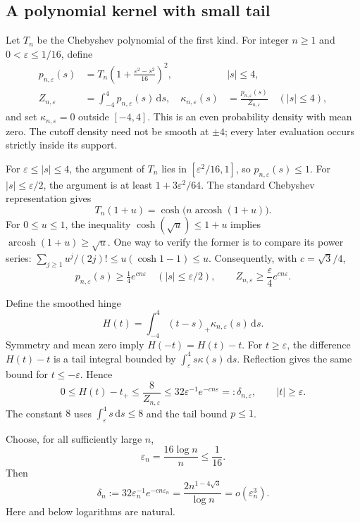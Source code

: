 \documentclass[11pt]{article}
\theoremstyle{definition}\newtheorem{definition}[theorem]{Definition}
\theoremstyle{remark}\newtheorem{remark}[theorem]{Remark}
\newcommand{\rd}{\,\mathrm d}
\begin{document}
\subsection{A polynomial kernel with small tail}
Let $T_n$ be the Chebyshev polynomial of the first kind. For integer $n\ge1$ and $0<\varepsilon\le1/16$, define
\begin{align}
p_{n,\varepsilon}(s)&=T_n\left(1+\frac{\varepsilon^2-s^2}{16}\right)^2,
&&|s|\le4,\label{eq:chebkernel}\\
Z_{n,\varepsilon}&=\int_{-4}^4p_{n,\varepsilon}(s)\rd s,
&\kappa_{n,\varepsilon}(s)&=\frac{p_{n,\varepsilon}(s)}{Z_{n,\varepsilon}}
\quad(|s|\le4),\nonumber
\end{align}
and set $\kappa_{n,\varepsilon}=0$ outside $[-4,4]$. This is an even probability density with mean zero. The cutoff density need not be smooth at $\pm4$; every later evaluation occurs strictly inside its support.

For $\varepsilon\le|s|\le4$, the argument of $T_n$ lies in $[\varepsilon^2/16,1]$, so $p_{n,\varepsilon}(s)\le1$. For $|s|\le\varepsilon/2$, the argument is at least $1+3\varepsilon^2/64$. The standard Chebyshev representation \cite[Eq.~18.5.1]{dlmf} gives
\[
T_n(1+u)=\cosh\bigl(n\operatorname{arcosh}(1+u)\bigr).
\]
For $0\le u\le1$, the inequality $\cosh(\sqrt u)\le1+u$ implies $\operatorname{arcosh}(1+u)\ge\sqrt u$. One way to verify the former is to compare its power series:
$\sum_{j\ge1}u^j/(2j)!\le u(\cosh1-1)\le u$.
Consequently, with $c=\sqrt3/4$,
\begin{equation}
p_{n,\varepsilon}(s)\ge\tfrac14e^{cn\varepsilon}
\quad(|s|\le\varepsilon/2),\qquad
Z_{n,\varepsilon}\ge\frac\varepsilon4e^{cn\varepsilon}.
\label{eq:normalizer}
\end{equation}

Define the smoothed hinge
\[
H(t)=\int_{-4}^4(t-s)_+\kappa_{n,\varepsilon}(s)\rd s.
\]
Symmetry and mean zero imply $H(-t)=H(t)-t$. For $t\ge\varepsilon$, the difference $H(t)-t$ is a tail integral bounded by $\int_\varepsilon^4s\kappa(s)\rd s$. Reflection gives the same bound for $t\le-\varepsilon$. Hence
\begin{equation}
0\le H(t)-t_+\le\frac8{Z_{n,\varepsilon}}
\le32\varepsilon^{-1}e^{-cn\varepsilon}=:\delta_{n,\varepsilon},
\qquad |t|\ge\varepsilon.
\label{eq:hingeerror}
\end{equation}
The constant $8$ uses $\int_\varepsilon^4s\rd s\le8$ and the tail bound $p\le1$.

Choose, for all sufficiently large $n$,
\begin{equation}
\varepsilon_n=\frac{16\log n}{n}\le\frac1{16}.
\label{eq:epsilon}
\end{equation}
Then
\begin{equation}
\delta_n:=32\varepsilon_n^{-1}e^{-cn\varepsilon_n}
=\frac{2n^{1-4\sqrt3}}{\log n}=o(\varepsilon_n^3).
\label{eq:deltarate}
\end{equation}
Here and below logarithms are natural.
\end{document}
